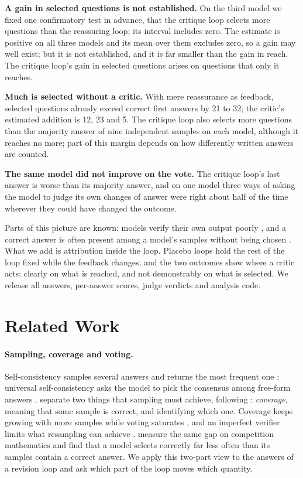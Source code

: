 \documentclass[11pt]{article}
\begin{document}
\textbf{A gain in selected questions is not established.}
On the third model we fixed one confirmatory test in advance, that the critique loop selects more questions than the reassuring loop; its interval includes zero.
The estimate is positive on all three models and its mean over them excludes zero, so a gain may well exist; but it is not established, and it is far smaller than the gain in reach.
The critique loop's gain in selected questions arises on questions that only it reaches.

\textbf{Much is selected without a critic.}
With mere reassurance as feedback, selected questions already exceed correct first answers by 21 to 32; the critic's estimated addition is 12, 23 and 5.
The critique loop also selects more questions than the majority answer of nine independent samples on each model, although it reaches no more; part of this margin depends on how differently written answers are counted.

\textbf{The same model did not improve on the vote.}
The critique loop's last answer is worse than its majority answer, and on one model three ways of asking the model to judge its own changes of answer were right about half of the time wherever they could have changed the outcome.

Parts of this picture are known: models verify their own output poorly \citep{huang2024cannot,stechly2024selfverification,song2024mindgap}, and a correct answer is often present among a model's samples without being chosen \citep{brown2024monkeys,jain2026cliff}.
What we add is attribution inside the loop.
Placebo loops hold the rest of the loop fixed while the feedback changes, and the two outcomes show where a critic acts: clearly on what is reached, and not demonstrably on what is selected.
We release all answers, per-answer scores, judge verdicts and analysis code.

\section{Related Work}

\paragraph{Sampling, coverage and voting.}
Self-consistency samples several answers and returns the most frequent one \citep{wang2023selfconsistency,aggarwal2023adaptive}; universal self-consistency asks the model to pick the consensus among free-form answers \citep{chen2023usc}.
\citet{brown2024monkeys} separate two things that sampling must achieve, following \citet{chen2021codex}: \emph{coverage}, meaning that some sample is correct, and identifying which one.
Coverage keeps growing with more samples while voting saturates \citep{chen2024morecalls}, and an imperfect verifier limits what resampling can achieve \citep{stroebl2024flaws}.
\citet{jain2026cliff} measure the same gap on competition mathematics and find that a model selects correctly far less often than its samples contain a correct answer.
We apply this two-part view to the answers of a revision loop and ask which part of the loop moves which quantity.
\end{document}
